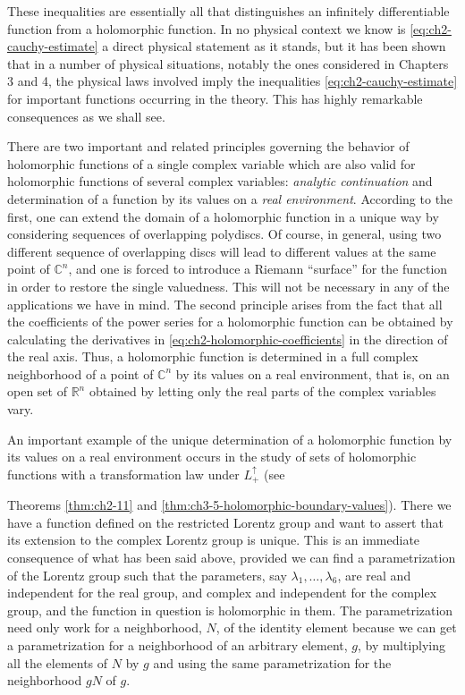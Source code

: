 These inequalities are essentially all that distinguishes an infinitely
differentiable function from a holomorphic function.  In no physical
context we know is \eqref{eq:ch2-cauchy-estimate} a direct physical statement as it stands, but it
has been shown that in a number of physical situations, notably the ones
considered in Chapters 3 and 4, the physical laws involved imply the
inequalities \eqref{eq:ch2-cauchy-estimate} for important functions occurring in the theory.  This
has highly remarkable consequences as we shall see.

There are two important and related principles governing the behavior of
holomorphic functions of a single complex variable which are also valid
for holomorphic functions of several complex variables: \emph{analytic
continuation} and determination of a function by its values on a \emph{real
environment}.  According to the first, one can extend the domain of a
holomorphic function in a unique way by considering sequences of
overlapping polydiscs.  Of course, in general, using two different sequence
of overlapping discs will lead to different values at the same point of
$\mathbb{C}^n$, and one is forced to introduce a Riemann ``surface'' for the
function in order to restore the single valuedness.  This will not be
necessary in any of the applications we have in mind.  The second principle
arises from the fact that all the coefficients of the power series for a
holomorphic function can be obtained by calculating the derivatives in
\eqref{eq:ch2-holomorphic-coefficients} in the direction of the real axis.  Thus, a holomorphic function is
determined in a full complex neighborhood of a point of $\mathbb{C}^n$ by
its values on a real environment, that is, on an open set of $\mathbb{R}^n$
obtained by letting only the real parts of the complex variables vary.

An important example of the unique determination of a holomorphic function
by its values on a real environment occurs in the study of sets of
holomorphic functions with a transformation law under $L^{\uparrow}_{+}$
(see

Theorems \ref{thm:ch2-11} and \ref{thm:ch3-5-holomorphic-boundary-values}).  There we have a function defined on the restricted
Lorentz group and want to assert that its extension to the complex Lorentz
group is unique.  This is an immediate consequence of what has been said
above, provided we can find a parametrization of the Lorentz group such
that the parameters, say $\lambda_1,\ldots,\lambda_6$, are real and
independent for the real group, and complex and independent for the complex
group, and the function in question is holomorphic in them.  The
parametrization need only work for a neighborhood, $N$, of the identity
element because we can get a parametrization for a neighborhood of an
arbitrary element, $g$, by multiplying all the elements of $N$ by $g$ and
using the same parametrization for the neighborhood $gN$ of $g$.

